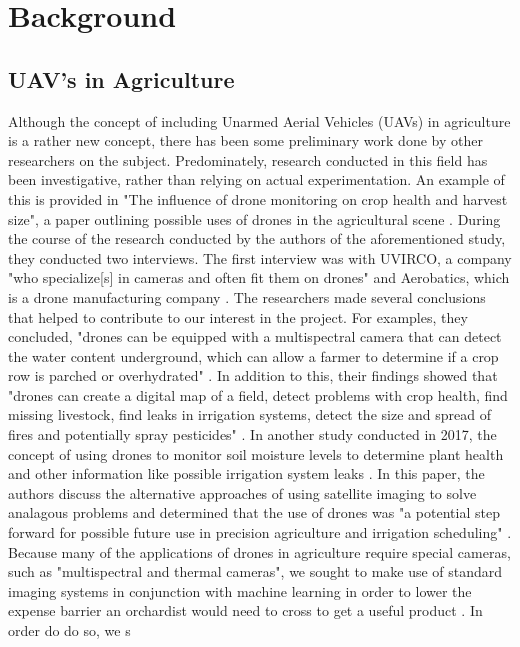 \section{Background}
\subsection{UAV's in Agriculture}
Although the concept of including Unarmed Aerial Vehicles (UAVs) in agriculture is a rather new concept, there has been some preliminary work done by other researchers on the subject.
Predominately, research conducted in this field has been investigative, rather than relying on actual experimentation.
An example of this is provided in "The influence of drone monitoring on crop health and harvest size", a paper outlining possible uses of drones in the agricultural scene \cite{Reinecke2017}.
During the course of the research conducted by the authors of the aforementioned study, they conducted two interviews. 
The first interview was with UVIRCO, a company "who specialize[s] in cameras and often fit them on drones" and Aerobatics, which is a drone manufacturing company \cite{Reinecke2017}.
The researchers made several conclusions that helped to contribute to our interest in the project.
For examples, they concluded, "drones can be equipped with a multispectral camera that can detect the water content underground, which can allow a farmer to determine if a crop row is parched or overhydrated" \cite{Reinecke2017}.
In addition to this, their findings showed that "drones can create a digital map of a field, detect problems with crop health, find missing livestock, find leaks in irrigation systems, detect the size and spread of fires and potentially spray pesticides" \cite{Reinecke2017}.
In another study conducted in 2017, the concept of using drones to monitor soil moisture levels to determine plant health and other information like possible irrigation system leaks \cite{Hassan2017}. In this paper, the authors discuss the alternative approaches of using satellite imaging to solve analagous problems and determined that the use of drones was "a potential step forward for possible future use in precision agriculture and irrigation scheduling" \cite{Hassan2017}.
\\
Because many of the applications of drones in agriculture require special cameras, such as "multispectral and thermal cameras", we sought to make use of standard imaging systems in conjunction with machine learning in order to lower the expense barrier an orchardist would need to cross to get a useful product \cite{Reinecke2017}.
In order do do so, we s